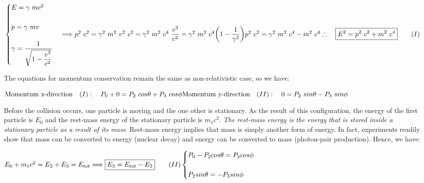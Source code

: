\documentclass[fleqn]{article}
\begin{document}
$
  \\
  \\
  \begin{cases}
    E=\gamma ~ mc^2
    \\
    \\
    p=\gamma ~ mv
    \\
    \\
    \gamma=\dfrac{1}{\sqrt{1-\dfrac{v^2}{c^2}}}
  \end{cases} \Longrightarrow p^2 ~ c^2=\gamma^2 ~ m^2 ~ v^2 ~ c^2=\gamma^2 ~ m^2 ~ c^4 ~ \dfrac{v^2}{c^2}
  =\gamma^2 ~ m^2 ~ c^4 \bigg( 1-\dfrac{1}{\gamma^2} \bigg)
  \\
  \\
  \\
  p^2 ~ c^2=\gamma^2 ~ m^2 ~ c^4 - m^2 ~ c^4
  \\
  \\
  \\
  \therefore ~~~ \boxed{
    E^2=p^2 ~ c^2+m^2 ~ c^4
  } ~~~~~~ (I)
  \\
  \\
  \\
$

The equations for momentum conservation remain the same as non-relativistic case, so we have:

$
  \\
  \\
  \text{Momentum x-direction} ~~~ (I): ~~~ P_0+0=P_2 ~ cos\theta+P_3 ~ cos \phi
  \\
  \\
  \text{Momentum y-direction} ~~~ (II): ~~~ 0=P_2 ~ sin\theta -P_3 ~ sin \phi
  \\
  \\
 $

Before the collision occurs, one particle is moving and the one other is stationary. As the result of this 
configuration, the energy of the first particle is $E_0$ and the rest-mass energy of the stationary particle 
is $m_1 c^2$. \emph{The rest-mass energy is the energy that is stored inside a stationary particle as a result of its mass}.
Rest-mass energy implies that mass is simply another form of energy. In fact, experiments readily show that mass 
can be converted to energy (nuclear decay) and energy can be converted to mass (photon-pair production). Hence, we have:

$
  \\
  E_0+m_1 c^2=E_2+E_3=E_{tot} \Longrightarrow \boxed{E_3=E_{tot}-E_2} ~~~~~~ (II)
  \\
  \\
  \begin{cases}
    P_0-P_2 cos \theta=P_3 cos \phi
    \\
    \\
    P_2 sin \theta=-P_3 sin \phi
  \end{cases}
  \\
  \\
$
\end{document}
